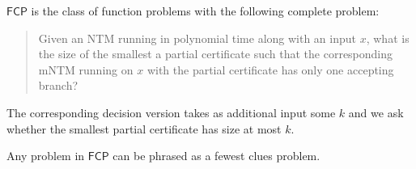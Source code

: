 \documentclass[runningheads,a4paper]{llncs}
\begin{document}
\begin{definition}
$\mathsf{FCP}$ is the class of function problems with the following complete problem:
\begin{quote}
Given an NTM running in polynomial time along with an input $x$, what is the size of the smallest a partial certificate such that the corresponding mNTM running on $x$ with the partial certificate has only one accepting branch?
\end{quote}
The corresponding decision version takes as additional input some $k$ and we ask whether the smallest partial certificate has size at most $k$.
\end{definition}

\begin{proposition}
Any problem in $\mathsf{FCP}$ can be phrased as a fewest clues problem.
\end{proposition}
\end{document}
